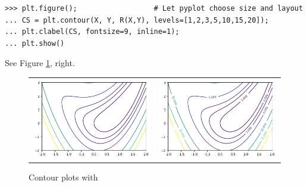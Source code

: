 \begin{verbatim}
>>> plt.figure();                  # Let pyplot choose size and layout
... CS = plt.contour(X, Y, R(X,Y), levels=[1,2,3,5,10,15,20]);
... plt.clabel(CS, fontsize=9, inline=1);
... plt.show()
\end{verbatim}

See Figure \ref{figure:contourplt}, right.

\begin{figure}[ht!]
\begin{tabular}{cc}
\includegraphics[width=0.5\linewidth]{images/contourplt.png} &
\includegraphics[width=0.5\linewidth]{images/contourplusplt.png}
\end{tabular}
\caption{Contour plots with \pyplot}
\label{figure:contourplt}
\end{figure}